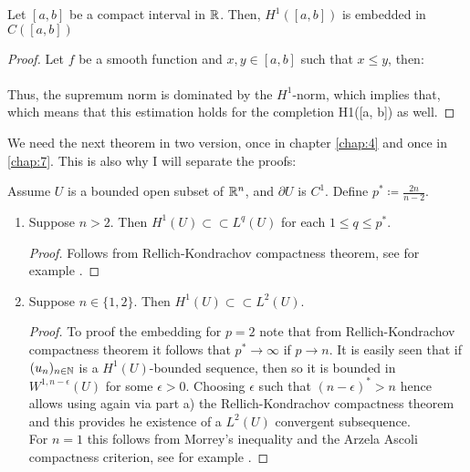 \begin{atheorem}
	Let $[a, b]$ be a compact interval in $\mathbb{R}$. Then, $H^{1}([a, b])$ is embedded in $C([a, b])$
	
	\begin{proof}
		Let $f$ be a smooth function and $x, y \in [a, b]$ such that $x \leq y$, then:
		~\\ ~\\ %
		Thus, the supremum norm is dominated by the $H^{1}$-norm, which implies that, which means that this estimation holds for the completion H1([a, b]) as well.
	\end{proof}
\end{atheorem}

We need the next theorem in two version, once in chapter \ref{chap:4} and once in \ref{chap:7}. This is also why I will separate the proofs:

\begin{atheorem} \label{compact-embedding-theorem} %
Assume $U$ is a bounded open subset of $\mathbb{R}^{n}$, and $\partial U$ is $C^{1}$. Define $p^{*} \coloneqq \frac{2 n}{n - 2}$.
	\begin{enumerate}[label=\alph*\upshape)]
		\item Suppose $n > 2$. Then $H^{1}(U) \subset\subset L^{q}(U)$ for each $1 \leq q \leq p^{*}$.
		
			\begin{proof}
				Follows from Rellich-Kondrachov compactness theorem, see for example \cite[page 272]{evans1998partial}.
			\end{proof}
		\item Suppose $n \in \{1, 2\}$. Then $H^{1}(U) \subset\subset L^{2}(U)$.
			\begin{proof} To proof the embedding for $p=2$ note that from Rellich-Kondrachov compactness theorem it follows that $p^{*} \rightarrow \infty$ if $p \rightarrow n$. It is easily seen that if $(u_{n})_{n \in \mathbb{N}}$ is a $H^{1}(U)$-bounded sequence, then so it is bounded in $W^{1, n-\epsilon}(U)$ for some $\epsilon > 0$. Choosing $\epsilon$ such that $(n - \epsilon)^{*} > n$ hence allows using again via part a) the Rellich-Kondrachov compactness theorem and  this provides he existence of a $L^{2}(U)$ convergent subsequence. ~\\
			For $n = 1$ this follows from Morrey's inequality and the Arzela Ascoli compactness criterion, see for example \cite[page 274]{evans1998partial}.
			\end{proof}
	\end{enumerate}
\end{atheorem}

